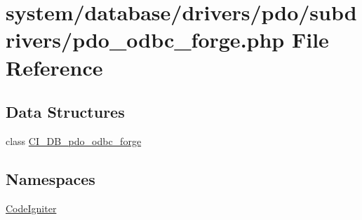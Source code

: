 \hypertarget{pdo__odbc__forge_8php}{}\section{system/database/drivers/pdo/subdrivers/pdo\+\_\+odbc\+\_\+forge.php File Reference}
\label{pdo__odbc__forge_8php}
\subsection*{Data Structures}
\begin{DoxyCompactItemize}
\item 
class \mbox{\hyperlink{class_c_i___d_b__pdo__odbc__forge}{C\+I\+\_\+\+D\+B\+\_\+pdo\+\_\+odbc\+\_\+forge}}
\end{DoxyCompactItemize}
\subsection*{Namespaces}
\begin{DoxyCompactItemize}
\item 
 \mbox{\hyperlink{namespace_code_igniter}{Code\+Igniter}}
\end{DoxyCompactItemize}
